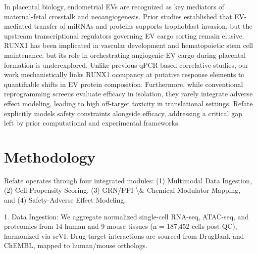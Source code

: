 \documentclass[11pt,a4paper]{article}
\begin{document}
In placental biology, endometrial EVs are recognized as key mediators of maternal-fetal crosstalk and neoangiogenesis. Prior studies established that EV-mediated transfer of miRNAs and proteins supports trophoblast invasion, but the upstream transcriptional regulators governing EV cargo sorting remain elusive. RUNX1 has been implicated in vascular development and hematopoietic stem cell maintenance, but its role in orchestrating angiogenic EV cargo during placental formation is underexplored. Unlike previous qPCR-based correlative studies, our work mechanistically links RUNX1 occupancy at putative response elements to quantifiable shifts in EV protein composition. Furthermore, while conventional reprogramming screens evaluate efficacy in isolation, they rarely integrate adverse effect modeling, leading to high off-target toxicity in translational settings. Refate explicitly models safety constraints alongside efficacy, addressing a critical gap left by prior computational and experimental frameworks.

\section{Methodology}
Refate operates through four integrated modules: (1) Multimodal Data Ingestion, (2) Cell Propensity Scoring, (3) GRN/PPI \textbackslash{}& Chemical Modulator Mapping, and (4) Safety-Adverse Effect Modeling. 

1. Data Ingestion: We aggregate normalized single-cell RNA-seq, ATAC-seq, and proteomics from 14 human and 9 mouse tissues (n = 187,452 cells post-QC), harmonized via scVI. Drug-target interactions are sourced from DrugBank and ChEMBL, mapped to human/mouse orthologs.
\end{document}
